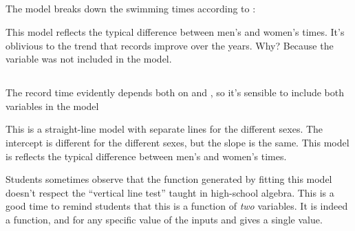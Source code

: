 \subsection{}

The model  breaks down the swimming times
according to :

\begin{knitrout}
\end{knitrout}


This model reflects the typical difference between men's and women's
times.  It's oblivious to the trend that records improve over the
years.  Why?  Because the variable  was not included in the model.

\subsection{}

The record time evidently depends both on  and , so
it's sensible to include both variables in the model

\begin{knitrout}
\end{knitrout}



This is a straight-line model with separate lines for the different
sexes. The intercept is different for the different sexes, but the
slope is the same.  
This model is reflects the typical difference between men's and women's
times.  

Students sometimes observe that the function generated by fitting this
model doesn't respect the ``vertical line test'' taught in high-school
algebra.  This is a good time to remind students that this is a
function of \emph{two} variables.  It is indeed a function, and for
any specific value of the inputs  and  gives a single value.


